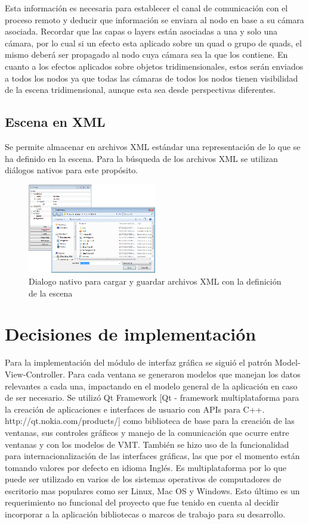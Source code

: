 Esta información es necesaria para establecer el canal de comunicación con el proceso remoto y deducir que información se enviara al nodo en base a su cámara asociada. Recordar que las capas o layers están asociadas a una y solo una cámara, por lo cual si un efecto esta aplicado sobre un quad o grupo de quads, el mismo deberá ser propagado al nodo cuya cámara sea la que los contiene. En cuanto a los efectos aplicados sobre objetos tridimensionales, estos serán enviados a todos los nodos ya que todas las cámaras de todos los nodos tienen visibilidad de la escena tridimensional, aunque esta sea desde perspectivas diferentes.

\subsection{Escena en XML}
Se permite almacenar en archivos XML estándar una representación de lo que se ha definido en la escena. Para la búsqueda de los archivos XML se utilizan diálogos nativos para este propósito.

\begin{figure}[H]
  \centering
    \includegraphics[width=0.5\textwidth]{./Cap5_vmt/vmt_loadShow.png}
  \caption{Dialogo nativo para cargar y guardar archivos XML con la definición de la escena}
  \label{fig:VMT-XML}
\end{figure}

\section{Decisiones de implementación}
Para la implementación del módulo de interfaz gráfica se siguió el patrón Model-View-Controller. Para cada ventana se generaron modelos que manejan los datos relevantes a cada una, impactando en el modelo general de la aplicación en caso de ser necesario.
Se utilizó Qt Framework [Qt - framework multiplataforma para la creación de aplicaciones e interfaces de usuario con APIs para C++. http://qt.nokia.com/products/] como biblioteca de base para la creación de las ventanas, sus controles gráficos y manejo de la comunicación que ocurre entre ventanas y con los modelos de VMT. También se hizo uso de la funcionalidad para internacionalización de las interfaces gráficas, las que por el momento están tomando valores por defecto en idioma Inglés. Es multiplataforma por lo que puede ser utilizado en varios de los sistemas operativos de computadores de escritorio mas populares como ser Linux, Mac OS y Windows. Esto último es un requerimiento no funcional del proyecto que fue tenido en cuenta al decidir incorporar a la aplicación bibliotecas o marcos de trabajo para su desarrollo.
